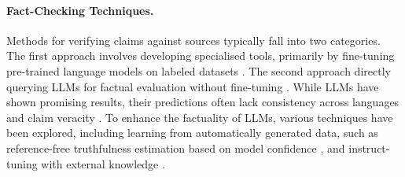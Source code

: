 \begin{table*}[ht!]
\small
\centering
{}
\caption{A comparison of multilingual or synthetic datasets for fact-checking.}
  \label{table:datasets_comparison}
\end{table*}


\paragraph{Fact-Checking Techniques.}
Methods for verifying claims against sources typically fall into two categories. The first approach involves developing specialised tools, primarily by fine-tuning pre-trained language models on labeled datasets \cite{thorne-etal-2018-fever, schuster-etal-2021-get, tianfine}. The second approach directly querying LLMs for factual evaluation without fine-tuning \cite{hu2024towards, shafayat2024multifact, 10.3389/frai.2024.1341697, singhal-etal-2024-multilingual}. 
While LLMs have shown promising results, their predictions often lack consistency across languages and claim veracity \cite{10.3389/frai.2024.1341697}. 
To enhance the factuality of LLMs, various techniques have been explored, including learning from automatically generated data, such as reference-free truthfulness estimation based on model confidence \cite{tianfine}, and instruct-tuning with external knowledge \cite{10317251}.